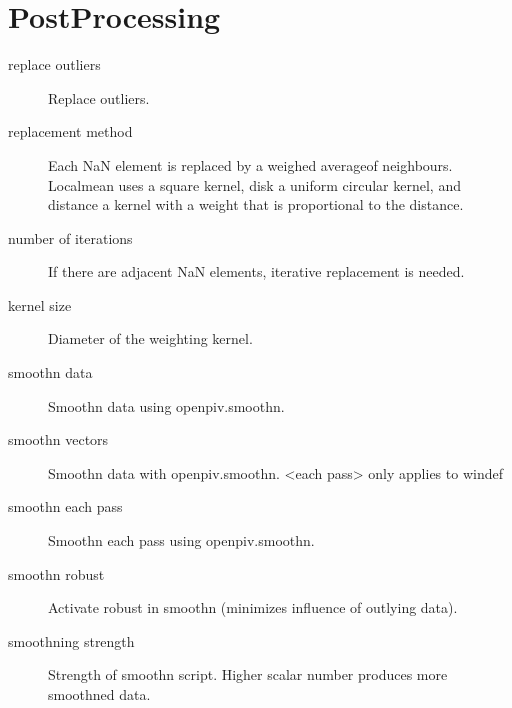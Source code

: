 \documentclass[letterpaper,10pt,english]{sphinxmanual}
\begin{document}
\section{Post\sphinxhyphen{}Processing}
\label{\detokenize{parameters:post-processing}}\begin{description}
\item[{replace outliers}] \leavevmode
Replace outliers.

\item[{replacement method}] \leavevmode
Each NaN element is replaced by a weighed averageof neighbours. Localmean uses a square kernel, disk a uniform circular kernel, and distance a kernel with a weight that is proportional to the distance.

\item[{number of iterations}] \leavevmode
If there are adjacent NaN elements, iterative replacement is needed.

\item[{kernel size}] \leavevmode
Diameter of the weighting kernel.

\item[{smoothn data}] \leavevmode
Smoothn data using openpiv.smoothn.

\item[{smoothn vectors}] \leavevmode
Smoothn data with openpiv.smoothn. \textless{}each pass\textgreater{} only applies to windef

\item[{smoothn each pass}] \leavevmode
Smoothn each pass using openpiv.smoothn.

\item[{smoothn robust}] \leavevmode
Activate robust in smoothn (minimizes influence of outlying data).

\item[{smoothning strength}] \leavevmode
Strength of smoothn script. Higher scalar number produces more smoothned data.

\end{description}
\end{document}
